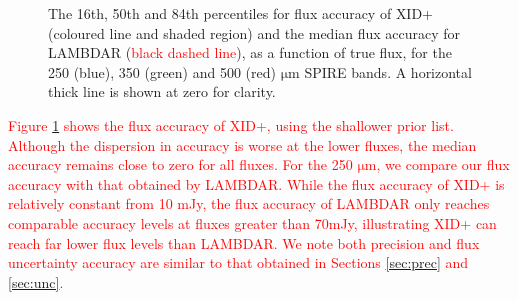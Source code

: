 \documentclass[useAMS,usenatbib]{mnras}
\begin{document}
\begin{figure}
\centering 
{}
\caption{The 16th, 50th and 84th percentiles for flux accuracy of \textsc{XID+} (coloured line and shaded region) and the median flux accuracy for \textsc{LAMBDAR} (\textcolor{red}{black dashed line}), as a function of true flux, for the 250 (blue), 350 (green) and 500 (red) $\mathrm{\mu m}$ SPIRE bands. A horizontal thick line is shown at zero for clarity.}\label{fig:accuracy_2}
\end{figure}

\textcolor{red}{Figure \ref{fig:accuracy_2} shows the flux accuracy of \textsc{XID+}, using the shallower prior list. Although the dispersion in accuracy is worse at the lower fluxes, the median accuracy remains close to zero for all fluxes. For the 250 $\mathrm{\mu m}$, we compare our flux accuracy with that obtained by \textsc{LAMBDAR}. While the flux accuracy of \textsc{XID+} is relatively constant from 10 mJy, the flux accuracy of \textsc{LAMBDAR} only reaches comparable accuracy levels at fluxes greater than 70mJy, illustrating \textsc{XID+} can reach far lower flux levels than \textsc{LAMBDAR}. We note both precision and flux uncertainty accuracy are similar to that obtained in Sections \ref{sec:prec} and \ref{sec:unc}.}
\end{document}
